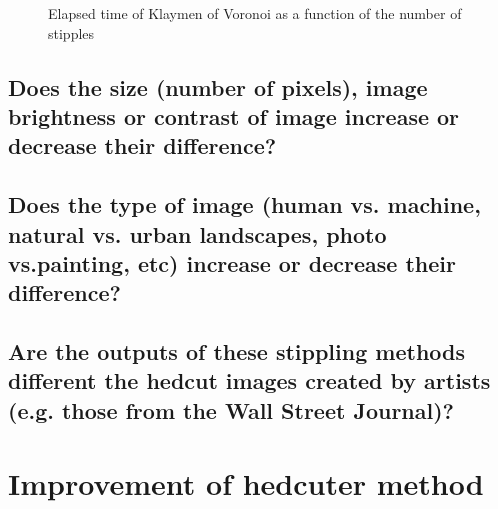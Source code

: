\documentclass[11pt]{article}
\begin{document}
\begin{figure}[hbpt] 
	\begin{center} 
		\hspace{5mm}

		\hspace{5mm}
	\caption{Elapsed time of Klaymen of Voronoi as a function of the number of stipples} 
	\label{fig:einsteinrunningtimevoronoi}
	\end{center} 
\end{figure}


\subsection{Does the size (number of pixels), image brightness or contrast of image increase or decrease their difference?}

\subsection{Does the type of image (human vs. machine, natural vs. urban landscapes, photo vs.painting, etc) increase or decrease their difference?}
\subsection{Are the outputs of these stippling methods different the hedcut images created by artists (e.g. those from the Wall Street Journal)?}

\section{Improvement of hedcuter method}



\end{document}
